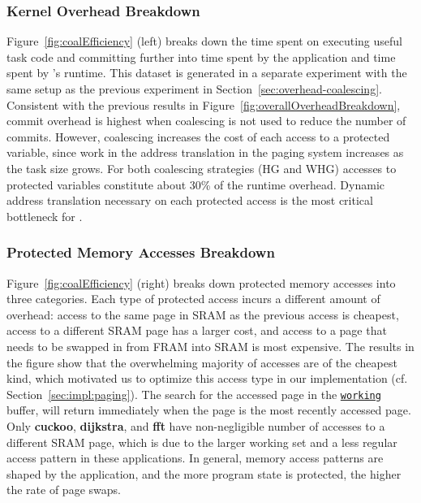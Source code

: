 
\subsubsection{\sys Kernel Overhead Breakdown}

Figure~\ref{fig:coalEfficiency} (left) breaks down the time spent on executing
useful task code and committing further into time spent by the application and
time spent by \sys's runtime.
%
This dataset is generated in a separate experiment with the same setup as the
previous experiment in Section~\ref{sec:overhead-coalescing}.
%
Consistent with the previous results in
Figure~\ref{fig:overallOverheadBreakdown}, commit overhead is highest when
coalescing is not used to reduce the number of commits.
%
However, coalescing increases the cost of each access to a protected variable,
since work in the address translation in the paging system increases as the
task size grows.
%
For both coalescing strategies (HG and WHG) accesses to protected variables
constitute about 30\% of the runtime overhead. Dynamic address translation
necessary on each protected access is the most critical bottleneck for \sys.


\subsubsection{Protected Memory Accesses Breakdown}

Figure~\ref{fig:coalEfficiency} (right) breaks down protected memory accesses
into three categories.
%
Each type of protected access incurs a different amount of overhead: access to
the same page in SRAM as the previous access is cheapest, access to a different
SRAM page has a larger cost, and access to a page that needs to be swapped in
from FRAM into SRAM is most expensive.
%
The results in the figure show that the overwhelming majority of accesses are
of the cheapest kind, which motivated us to optimize this access type in our
implementation (cf. Section~\ref{sec:impl:paging}).
%
The search for the accessed page in the \texttt{\underline{working}} buffer,
will return immediately when the page is the most recently accessed page.
%
Only \textbf{cuckoo}, \textbf{dijkstra}, and \textbf{fft} have non-negligible
number of accesses to a different SRAM page, which is due to the larger working
set and a less regular access pattern in these applications.
%
In general, memory access patterns are shaped by the application, and the more
program state is protected, the higher the rate of page swaps.

